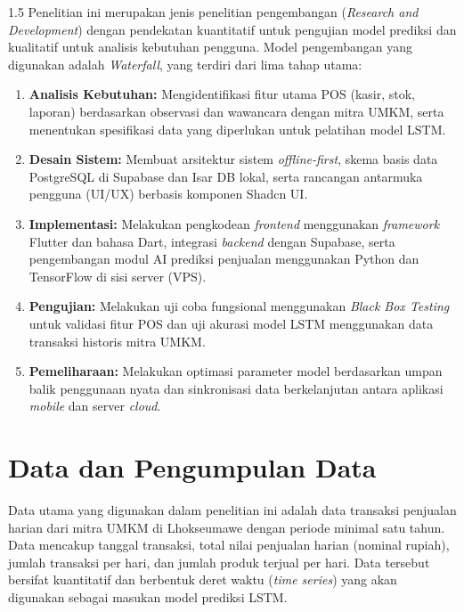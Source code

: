 \documentclass[12pt, a4paper, onecolumn, oneside]{report}
\begin{document}
\begin{spacing}{1.5}
Penelitian ini merupakan jenis penelitian pengembangan (\textit{Research and Development}) dengan pendekatan kuantitatif untuk pengujian model prediksi dan kualitatif untuk analisis kebutuhan pengguna. Model pengembangan yang digunakan adalah \textit{Waterfall}, yang terdiri dari lima tahap utama:
\begin{enumerate}
    \item \textbf{Analisis Kebutuhan:} Mengidentifikasi fitur utama POS (kasir, stok, laporan) berdasarkan observasi dan wawancara dengan mitra UMKM, serta menentukan spesifikasi data yang diperlukan untuk pelatihan model LSTM.
    \item \textbf{Desain Sistem:} Membuat arsitektur sistem \textit{offline-first}, skema basis data PostgreSQL di Supabase dan Isar DB lokal, serta rancangan antarmuka pengguna (UI/UX) berbasis komponen Shadcn UI.
    \item \textbf{Implementasi:} Melakukan pengkodean \textit{frontend} menggunakan \textit{framework} Flutter dan bahasa Dart, integrasi \textit{backend} dengan Supabase, serta pengembangan modul AI prediksi penjualan menggunakan Python dan TensorFlow di sisi server (VPS).
    \item \textbf{Pengujian:} Melakukan uji coba fungsional menggunakan \textit{Black Box Testing} untuk validasi fitur POS dan uji akurasi model LSTM menggunakan data transaksi historis mitra UMKM.
    \item \textbf{Pemeliharaan:} Melakukan optimasi parameter model berdasarkan umpan balik penggunaan nyata dan sinkronisasi data berkelanjutan antara aplikasi \textit{mobile} dan server \textit{cloud}.
\end{enumerate}

\section{Data dan Pengumpulan Data}

Data utama yang digunakan dalam penelitian ini adalah data transaksi penjualan harian dari mitra UMKM di Lhokseumawe dengan periode minimal satu tahun. Data mencakup tanggal transaksi, total nilai penjualan harian (nominal rupiah), jumlah transaksi per hari, dan jumlah produk terjual per hari. Data tersebut bersifat kuantitatif dan berbentuk deret waktu (\textit{time series}) yang akan digunakan sebagai masukan model prediksi LSTM.


\end{spacing}
\end{document}
